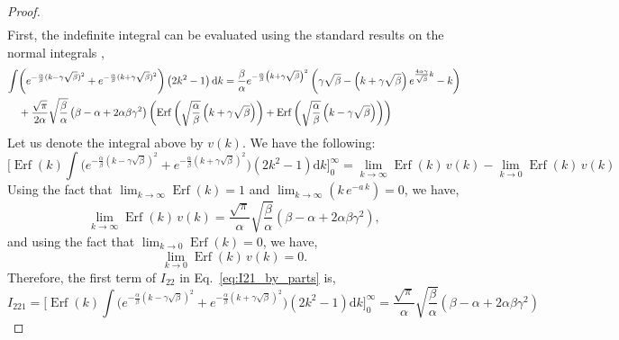 \documentclass[journal]{IEEEtran}
\theoremstyle{plain}
\theoremstyle{definition}
\theoremstyle{remark}
\newcommand{\Erf}{\operatorname{Erf}}
\newcommand{\dd}{\mathrm{d}}
\begin{document}
\begin{proof}
\begin{equation}
\begin{split}
\end{split} \label{eq:I21_by_parts}
\end{equation}
First, the indefinite integral can be evaluated using the standard results on the normal integrals \cite{owen1980table},
\begin{equation}
\begin{split}
    \int &\biggl(e^{ -\frac{\alpha}{\beta}  (k - \gamma\sqrt{\beta})^{2}} +  e^{ -\frac{\alpha}{\beta} (k + \gamma\sqrt{\beta})^{2}} \biggr)  \left(2 k^2 - 1\right) \dd k = \frac{\beta}{\alpha} e^{-\frac{\alpha}{\beta}  \left(k + \gamma\sqrt{\beta } \right)^2} \left( \gamma\sqrt{\beta } -\left(k + \gamma\sqrt{\beta } \right) e^{\frac{4 \alpha  \gamma }{\sqrt{\beta }} k} - k\right) \\& + \frac{\sqrt{\pi}}{2\alpha} \sqrt{\frac{\beta }{\alpha }} \left(\beta - \alpha  +2 \alpha\beta \gamma ^2 \right) \left(\Erf\left(\sqrt{\frac{\alpha}{\beta}}\left(k+\gamma\sqrt{\beta}\right)\right)+\Erf\left(\sqrt{\frac{\alpha}{\beta}}\left(k-\gamma\sqrt{\beta}\right) \right)\right)
\end{split}
\label{eq:integral_vk}
\raisetag{30pt}
\end{equation}
Let us denote the integral above by $v(k)$. We have the following:
\begin{equation}
    \biggl[\Erf(k) \int \biggl(e^{ -\frac{\alpha}{\beta} (k - \gamma\sqrt{\beta})^{2}} + e^{ -\frac{\alpha}{\beta} (k + \gamma\sqrt{\beta})^{2}} \biggr)\left(2 k^2 - 1\right) \dd k \biggr]_0^\infty = \lim_{k \rightarrow \infty} \Erf(k)\, v(k) - \lim_{k \rightarrow 0} \Erf(k) \,v(k)
\end{equation}
Using the fact that $\lim_{k \rightarrow \infty} \Erf(k) = 1$ and $\lim_{k \rightarrow \infty} \left(k\,e^{-a \,k}\right) = 0$, we have,
\begin{equation}
    \lim_{k \rightarrow \infty} \Erf(k) \, v(k) = \frac{\sqrt{\pi}}{\alpha} \sqrt{\frac{\beta }{\alpha }} \left(\beta - \alpha  +2 \alpha\beta \gamma ^2 \right),
\end{equation}
and using the fact that $\lim_{k \rightarrow 0} \Erf(k) = 0$, we have,
\begin{equation}
    \lim_{k \rightarrow 0} \Erf(k) \, v(k) = 0.
\end{equation}
Therefore, the first term of $I_{22}$ in Eq.~\eqref{eq:I21_by_parts} is,
\begin{equation}
    I_{221} = \biggl[\Erf(k) \int \biggl(e^{ -\frac{\alpha}{\beta} (k - \gamma\sqrt{\beta})^{2}} + e^{ -\frac{\alpha}{\beta} (k + \gamma\sqrt{\beta})^{2}} \biggr)\left(2 k^2 - 1\right) \dd k \biggr]_0^\infty = \frac{\sqrt{\pi}}{\alpha} \sqrt{\frac{\beta }{\alpha }} \left(\beta - \alpha  +2 \alpha\beta \gamma ^2 \right)

\end{equation}
\end{proof}
\end{document}
